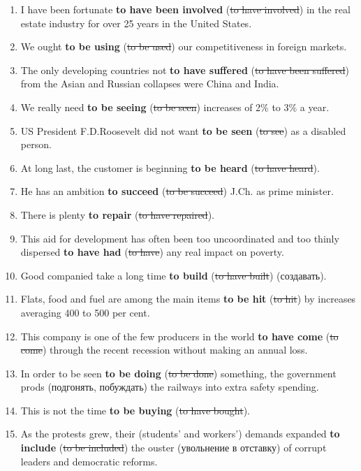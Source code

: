 \documentclass[main.tex]{subfiles}
\begin{document}
\newpage
\setcounter{subsection}{6}


\begin{enumerate}[nosep,leftmargin=*]
	\itemsep\eitsp
	\item I have been fortunate \textbf{to have been involved} (\st{to have involved}) in the real estate industry for over 25 years in the United States.
	\item We ought \textbf{to be using} (\st{to be used}) our competitiveness in foreign markets.
	\item The only developing countries not \textbf{to have suffered} (\st{to have been suffered}) from the Asian and Russian collapses were China and India.
	\item We really need \textbf{to be seeing} (\st{to be seen}) increases of 2\% to 3\% a year.
	\item US President F.D.Roosevelt did not want \textbf{to be seen} (\st{to see}) as a disabled person.
	\item At long last, the customer is beginning \textbf{to be heard} (\st{to have heard}).
	\item He has an ambition \textbf{to succeed} (\st{to be succeed}) J.Ch. as prime minister.
	\item There is plenty \textbf{to repair} (\st{to have repaired}).
	\item This aid for development has often been too uncoordinated and too thinly dispersed \textbf{to have had} (\st{to have}) any real impact on poverty.
	\item Good companied take a long time \textbf{to build} (\st{to have built}) (создавать).
	\item Flats, food and fuel are among the main items \textbf{to be hit} (\st{to hit}) by increases averaging 400 to 500 per cent.
	\item This company is one of the few producers in the world \textbf{to have come} (\st{to come}) through the recent recession without making an annual loss.
	\item In order to be seen \textbf{to be doing} (\st{to be done}) something, the government prods (подгонять, побуждать) the railways into extra safety spending.
	\item This is not the time \textbf{to be buying} (\st{to have bought}).
	\item As the protests grew, their (students' and workers') demands expanded \textbf{to include} (\st{to be included}) the ouster (увольнение в отставку) of corrupt leaders and democratic reforms.

\end{enumerate}
\end{document}
